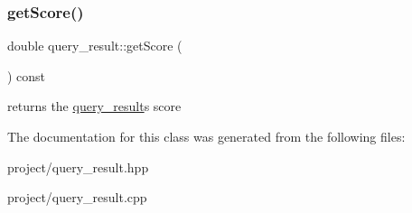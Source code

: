 \subsubsection{\texorpdfstring{get\+Score()}{getScore()}}
{\footnotesize\ttfamily double query\+\_\+result\+::get\+Score (\begin{DoxyParamCaption}{ }\end{DoxyParamCaption}) const}

returns the \hyperlink{classquery__result}{query\+\_\+result}\textquotesingle{}s score 

The documentation for this class was generated from the following files\+:\begin{DoxyCompactItemize}
\item 
project/query\+\_\+result.\+hpp\item 
project/query\+\_\+result.\+cpp\end{DoxyCompactItemize}
